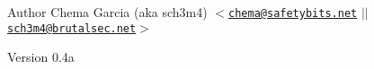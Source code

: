 \begin{DoxyAuthor}{Author}
Chema Garcia (aka sch3m4) $<$\href{mailto:chema@safetybits.net}{\tt chema@safetybits.\-net} $\vert$$\vert$ \href{mailto:sch3m4@brutalsec.net}{\tt sch3m4@brutalsec.\-net}$>$
\end{DoxyAuthor}
\begin{DoxyVersion}{Version}
0.\-4a 
\end{DoxyVersion}
